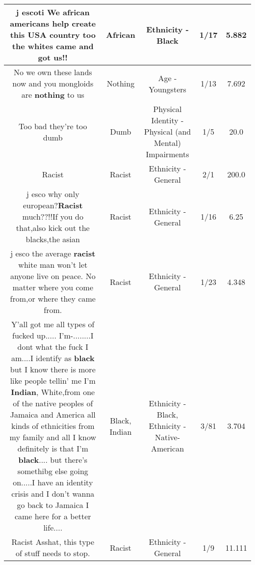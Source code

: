 \documentclass[11pt]{article}
\newlength\mylength
\begin{document}
\begin{center}
\begin{longtable}{|C{.65\mylength}|C{.30\mylength}|C{.12\mylength}|C{.12\mylength}|C{.12\mylength}|}
  \small j escoti We \textbf{african} americans help create this USA country too the whites came and got us!!\normalsize   & African & Ethnicity - Black & 1/17 & 5.882 \\  \hline
  \small No we own these lands now and you mongloids are \textbf{nothing} to us\normalsize   & Nothing & Age - Youngsters & 1/13 & 7.692 \\  \hline
  \small Too bad they're too dumb\normalsize   & Dumb & Physical Identity - Physical (and Mental) Impairments & 1/5 & 20.0 \\  \hline
  \small Racist\normalsize   & Racist & Ethnicity - General & 2/1 & 200.0 \\  \hline
  \small j esco why only european?\textbf{Racist} much??!!If you do that,also kick out the blacks,the asian\normalsize   & Racist & Ethnicity - General & 1/16 & 6.25 \\  \hline
  \small j esco the average \textbf{racist} white man won't let anyone live on peace. No matter where you come from,or where they came from.\normalsize   & Racist & Ethnicity - General & 1/23 & 4.348 \\  \hline
  \small Y'all got me all types of fucked up..... I'm-........I dont what the fuck I am....I identify as \textbf{black} but I know there is more like people tellin' me I'm \textbf{Indian}, White,from one of the native peoples of Jamaica and America  all kinds of ethnicities from my family and all I know definitely is that I'm \textbf{black}.... but there's somethibg else going on.....I have an identity crisis and I don't wanna go back to Jamaica I came here for a better life....\normalsize   & Black, Indian & Ethnicity - Black, Ethnicity - Native-American & 3/81 & 3.704 \\  \hline
  \small Racist Asshat, this type of stuff needs to stop.\normalsize   & Racist & Ethnicity - General & 1/9 & 11.111 \\  \hline

\end{longtable}
\end{center}
\end{document}

